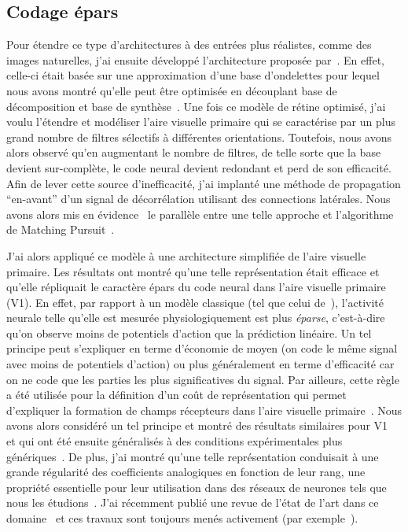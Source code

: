 \documentclass[11pt,french,a4paper,oneside]{article}%
\begin{document}
\subsection{Codage épars}
Pour étendre ce type d'architectures à des entrées plus réalistes, comme des images naturelles, j'ai ensuite développé l'architecture proposée par~\citet{van-Rullen01a}. En effet, celle-ci était basée sur une approximation d'une base d'ondelettes pour lequel nous avons montré qu'elle peut être optimisée en découplant base de décomposition et base de synthèse~\citep{Perrinet04a}. Une fois ce modèle de rétine optimisé, j'ai voulu l'étendre et modéliser l'aire visuelle primaire qui se caractérise par un plus grand nombre de filtres sélectifs à différentes orientations. Toutefois, nous avons alors observé qu'en augmentant le nombre de filtres, de telle sorte que la base devient sur-complète, le code neural devient redondant et perd de son efficacité. Afin de lever cette source d'inefficacité, j'ai implanté une méthode de propagation ``en-avant'' d'un signal de décorrélation utilisant des connections latérales. Nous avons alors mis en évidence~\citep{Perrinet02sparse,Perrinet02esann,Perrinet02nsi} le parallèle entre une telle approche et l'algorithme de Matching Pursuit~\citep{Mallat93}. %

J'ai alors appliqué ce modèle à une architecture simplifiée de l'aire visuelle primaire. Les résultats ont montré qu'une telle représentation était efficace et qu'elle répliquait le caractère épars du code neural dans l'aire visuelle primaire (V1). En effet, par rapport à un modèle classique (tel que celui de~\citep{van-Rullen01a}), l'activité neurale telle qu'elle est mesurée physiologiquement est plus \emph{éparse}, c'est-à-dire qu'on observe moins de potentiels d'action que la prédiction linéaire. Un tel principe peut s'expliquer en terme d'économie de moyen (on code le même signal avec moins de potentiels d'action) ou plus généralement en terme d'efficacité car on ne code que les parties les plus significatives du signal. Par ailleurs, cette règle a été utilisée pour la définition d'un coût de représentation qui permet d'expliquer la formation de champs récepteurs dans l'aire visuelle primaire~\citep{Olshausen96}. Nous avons alors considéré un tel principe et montré des résultats similaires pour V1~\citep{Perrinet03} et qui ont été ensuite généralisés à des conditions expérimentales plus génériques~\citep{Perrinet10shl}. De plus, j'ai montré qu'une telle représentation conduisait à une grande régularité des coefficients analogiques en fonction de leur rang, une propriété essentielle pour leur utilisation dans des réseaux de neurones tels que nous les étudions~\citep{Perrinet04a}. J'ai récemment publié une revue de l'état de l'art dans ce domaine~\citep{Perrinet15bicv} et ces travaux sont toujours menés activement (par exemple~\citep{Perrinet16EUVIP}). %
\end{document}

